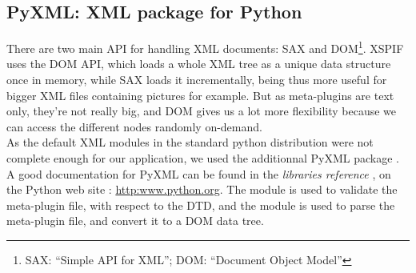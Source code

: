 \subsection{PyXML: XML package for Python}

\noindent There are two main API for handling XML documents:
SAX and DOM\footnote{SAX: ``Simple API for XML''; DOM: ``Document Object
 Model''}. XSPIF uses the DOM API, which loads a whole XML tree as a
unique data structure once in memory, while SAX loads it incrementally,
 being thus more useful for bigger XML files containing pictures for
example. But as meta-plugins are text only, they're not really big, and
DOM gives us a lot more flexibility because we can access the
different nodes randomly on-demand.\\ 

\noindent As the default XML modules in the standard python
distribution were not complete enough for our application, we used the
additionnal PyXML package \cite{pyxml:site}. A good documentation for
PyXML can be found in the \emph{libraries reference} \cite{python:library}, on the Python
web site : \url{http:www.python.org}. The module
 is used to validate the meta-plugin file,
with respect to the DTD, and the module  is used
to parse the meta-plugin file, and convert it to a DOM data tree.\\ 

